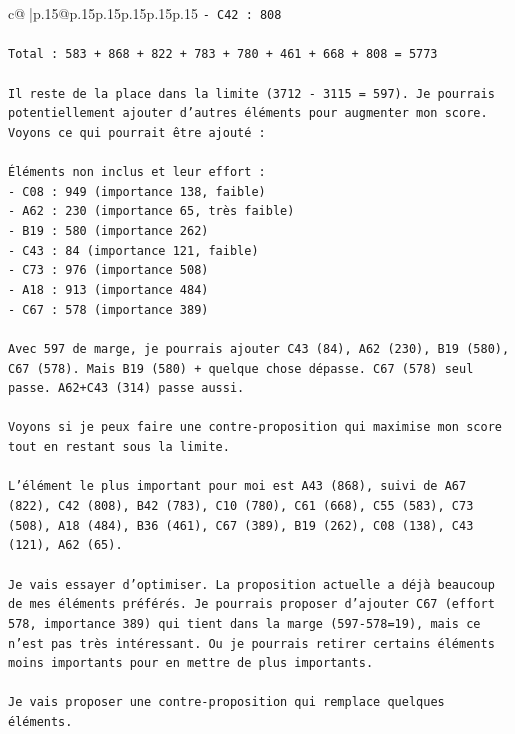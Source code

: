 \documentclass{article}
\begin{document}
{\begin{supertabular}{c@{$\;$}|p{.15\linewidth}@{}p{.15\linewidth}p{.15\linewidth}p{.15\linewidth}p{.15\linewidth}p{.15\linewidth}}
{{{\texttt{{-} C42 : 808} \\
\\ 
\texttt{Total : 583 + 868 + 822 + 783 + 780 + 461 + 668 + 808 = 5773} \\
\\ 
\texttt{Il reste de la place dans la limite (3712 {-} 3115 = 597). Je pourrais potentiellement ajouter d'autres éléments pour augmenter mon score. Voyons ce qui pourrait être ajouté :} \\
\\ 
\texttt{Éléments non inclus et leur effort :} \\
\texttt{{-} C08 : 949 (importance 138, faible)} \\
\texttt{{-} A62 : 230 (importance 65, très faible)} \\
\texttt{{-} B19 : 580 (importance 262)} \\
\texttt{{-} C43 : 84 (importance 121, faible)} \\
\texttt{{-} C73 : 976 (importance 508)} \\
\texttt{{-} A18 : 913 (importance 484)} \\
\texttt{{-} C67 : 578 (importance 389)} \\
\\ 
\texttt{Avec 597 de marge, je pourrais ajouter C43 (84), A62 (230), B19 (580), C67 (578). Mais B19 (580) + quelque chose dépasse. C67 (578) seul passe. A62+C43 (314) passe aussi.} \\
\\ 
\texttt{Voyons si je peux faire une contre{-}proposition qui maximise mon score tout en restant sous la limite.} \\
\\ 
\texttt{L'élément le plus important pour moi est A43 (868), suivi de A67 (822), C42 (808), B42 (783), C10 (780), C61 (668), C55 (583), C73 (508), A18 (484), B36 (461), C67 (389), B19 (262), C08 (138), C43 (121), A62 (65).} \\
\\ 
\texttt{Je vais essayer d'optimiser. La proposition actuelle a déjà beaucoup de mes éléments préférés. Je pourrais proposer d'ajouter C67 (effort 578, importance 389) qui tient dans la marge (597{-}578=19), mais ce n'est pas très intéressant. Ou je pourrais retirer certains éléments moins importants pour en mettre de plus importants.} \\
\\ 
\texttt{Je vais proposer une contre{-}proposition qui remplace quelques éléments.} \\
}}}
\end{supertabular}}
\end{document}

